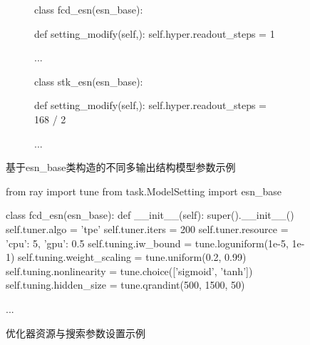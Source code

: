 \begin{figure}[t!]
    \begin{minipage}[b]{0.45\textwidth}
        \begin{subfigure}{\linewidth}
            \begin{python}
                class fcd_esn(esn_base):
        
                    def setting_modify(self,):
                        self.hyper.readout_steps = 1
        
                    ...
            \end{python}
        \end{subfigure}

    \end{minipage}
    \hfill
    \begin{minipage}[b]{0.45\textwidth}
        \begin{subfigure}{\linewidth}
            \begin{python}
                class stk_esn(esn_base):
        
                    def setting_modify(self,):
                        self.hyper.readout_steps = 168 / 2
        
                    ...
            \end{python}
        \end{subfigure}
    \end{minipage}

    \caption{基于esn_base类构造的不同多输出结构模型参数示例\label{fig:ch.univ.read}}
\end{figure}

\begin{figure}[t!]
    \begin{python}
from ray import tune
from task.ModelSetting import esn_base

class fcd_esn(esn_base):
    def __init__(self):
        super().__init__()
        self.tuner.algo = 'tpe'
        self.tuner.iters = 200
        self.tuner.resource = {
            'cpu': 5, 'gpu': 0.5
        }
        self.tuning.iw_bound = tune.loguniform(1e-5, 1e-1)
        self.tuning.weight_scaling = tune.uniform(0.2, 0.99)
        self.tuning.nonlinearity = tune.choice(['sigmoid', 'tanh'])
        self.tuning.hidden_size = tune.qrandint(500, 1500, 50)
    
    ...
    \end{python}
\caption{优化器资源与搜索参数设置示例\label{fig:ch.univ.tune}}
\end{figure}